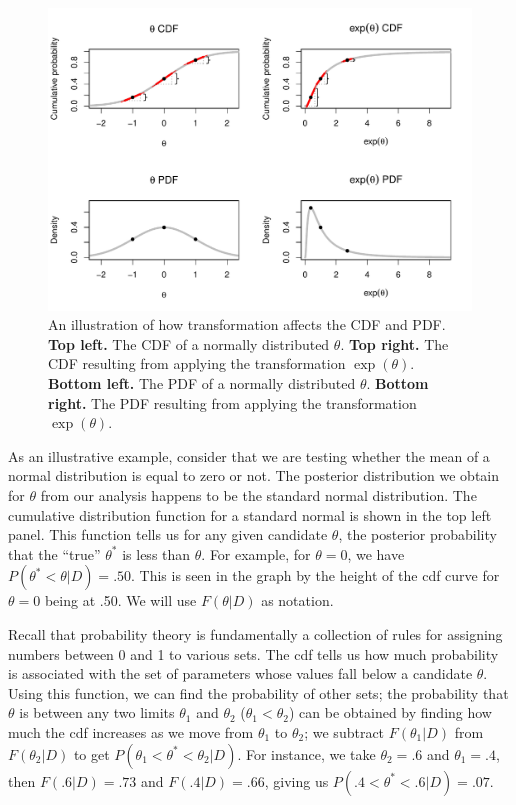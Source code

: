 \documentclass[man]{apa}
\begin{document}
\begin{figure}[t]
    \centering
    \includegraphics[width=.85\textwidth]{idunno.pdf}
    \caption{An illustration of how transformation affects the CDF and PDF. \textbf{Top left.} The CDF of a normally distributed $\theta$. \textbf{Top right.} The CDF resulting from applying the transformation $\exp(\theta)$. \textbf{Bottom left.} The PDF of a normally distributed $\theta$. \textbf{Bottom right.} The PDF resulting from applying the transformation $\exp(\theta)$.}
    \label{fig:normals}
\end{figure}

As an illustrative example, consider that we are testing whether the mean of a normal distribution is equal to zero or not. The posterior distribution we obtain for $\theta$ from our analysis happens to be the standard normal distribution. The cumulative distribution function for a standard normal is shown in the top left panel. This function tells us for any given candidate $\theta$, the posterior probability that the ``true'' $\theta^*$ is less than $\theta$. For example, for $\theta=0$, we have $P(\theta^*<\theta|D) = .50$. This is seen in the graph by the height of the cdf curve for $\theta=0$ being at .50. We will use $F(\theta|D)$ as notation.

Recall that probability theory is fundamentally a collection of rules for assigning numbers between 0 and 1 to various sets. The cdf tells us how much probability is associated with the set of parameters whose values fall below a candidate $\theta$. Using this function, we can find the probability of other sets; the probability that $\theta$ is between any two limits $\theta_1$ and $\theta_2$ ($\theta_1<\theta_2$) can be obtained by finding how much the cdf increases as we move from $\theta_1$ to $\theta_2$; we subtract $F(\theta_1|D)$ from $F(\theta_2|D)$ to get $P(\theta_1<\theta^*<\theta_2|D)$. For instance, we take $\theta_2=.6$ and $\theta_1=.4$, then $F(.6|D)=.73$ and $F(.4|D)=.66$, giving us $P(.4<\theta^*<.6|D)=.07$. 
\end{document}
